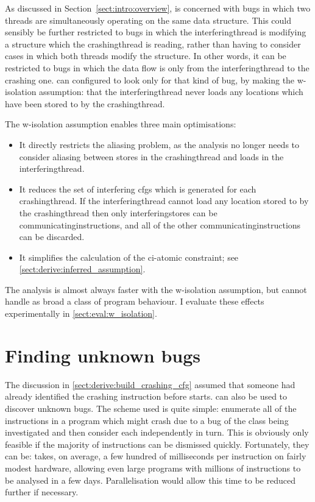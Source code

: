 
As discussed in Section~\ref{sect:intro:overview}, {\technique} is
concerned with bugs in which two threads are simultaneously operating
on the same data structure.  This could sensibly be further restricted
to bugs in which the \gls{interferingthread} is modifying a structure
which the \gls{crashingthread} is reading, rather than having to
consider cases in which both threads modify the structure.  In other
words, it can be restricted to bugs in which the data flow is only
from the \gls{interferingthread} to the crashing one.
{\Implementation} can configured to look only for that kind of bug, by
making the \gls{w-isolation} assumption: that the
\gls{interferingthread} never loads any locations which have been
stored to by the \gls{crashingthread}.

The \gls{w-isolation} assumption enables three main optimisations:

\begin{itemize}
\item
  It directly restricts the aliasing problem, as the analysis no
  longer needs to consider aliasing between stores in the
  \gls{crashingthread} and loads in the \gls{interferingthread}.
\item
  It reduces the set of interfering \glspl{cfg} which is generated for
  each \gls{crashingthread}.  If the \gls{interferingthread} cannot
  load any location stored to by the \gls{crashingthread} then only
  \glspl{interferingstore} can be \glspl{communicatinginstruction},
  and all of the other \glspl{communicatinginstruction} can be
  discarded.
\item
  It simplifies the calculation of the \gls{ci-atomic} constraint;
  see \autoref{sect:derive:inferred_assumption}.
\end{itemize}

The analysis is almost always faster with the \gls{w-isolation}
assumption, but cannot handle as broad a class of program behaviour.
I evaluate these effects experimentally in
\autoref{sect:eval:w_isolation}.



\section{Finding unknown bugs}
\label{sect:derive:unknown_bugs}

The discussion in \autoref{sect:derive:build_crashing_cfg} assumed
that someone had already identified the crashing instruction before
{\technique} starts.  {\Technique} can also be used to discover
unknown bugs.  The scheme used is quite simple: enumerate all of the
instructions in a program which might crash due to a bug of the class
being investigated and then consider each independently in turn.  This
is obviously only feasible if the majority of instructions can be
dismissed quickly.  Fortunately, they can be: {\implementation} takes,
on average, a few hundred of milliseconds per instruction on fairly
modest hardware, allowing even large programs with millions of
instructions to be analysed in a few days.  Parallelisation would allow this time to be
reduced further if necessary.

